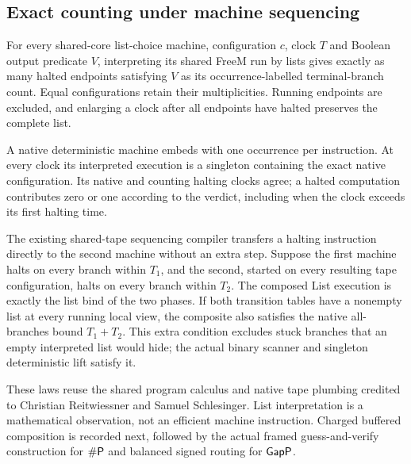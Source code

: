 \begin{result}
\subsection{Exact counting under machine sequencing}
For every shared-core list-choice machine, configuration $c$, clock $T$ and
Boolean output predicate $V$, interpreting its shared FreeM run by lists gives
exactly as many halted endpoints satisfying $V$ as its occurrence-labelled
terminal-branch count. Equal configurations retain their multiplicities.
Running endpoints are excluded, and enlarging a clock after all endpoints have
halted preserves the complete list.

A native deterministic machine embeds with one occurrence per instruction.
At every clock its interpreted execution is a singleton containing the exact
native configuration. Its native and counting halting clocks agree; a halted
computation contributes zero or one according to the verdict, including when
the clock exceeds its first halting time.

The existing shared-tape sequencing compiler transfers a halting instruction
directly to the second machine without an extra step. Suppose the first
machine halts on every branch within $T_1$, and the second, started on every
resulting tape configuration, halts on every branch within $T_2$. The composed
List execution is exactly the list bind of the two phases. If both transition
tables have a nonempty list at every running local view, the composite also
satisfies the native all-branches bound $T_1+T_2$. This extra condition excludes
stuck branches that an empty interpreted list would hide; the actual binary
scanner and singleton deterministic lift satisfy it.

These laws reuse the shared program calculus and native tape plumbing credited
to Christian Reitwiessner and Samuel Schlesinger. List interpretation is a
mathematical observation, not an efficient machine instruction. Charged buffered
composition is recorded next, followed by the actual framed guess-and-verify
construction for $\#\mathsf{P}$ and balanced signed routing for $\mathsf{GapP}$.
\end{result}

